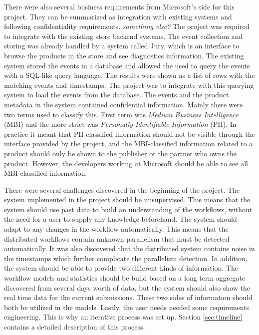 \documentclass[english,12pt,a4paper,pdftex,sci,utf8]{aaltothesis}
\newcommand{\nyi}[1]{\colorbox{nyibg}{\textcolor{nyitext}{\emph{#1}}}}
\begin{document}
There were also several business requirements from Microsoft's side for this project. They can be summarized as integration with existing systems and following confidentiality requirements. \nyi{something else?}
The project was required to integrate with the existing store backend systems. 
The event collection and storing was already handled by a system called Jury, which is an interface to browse the products in the store and see diagnostics information.
The existing system stored the events in a database and allowed the used to query the events with a SQL-like query language. The results were shown as a list of rows with the matching events and timestamps. The project was to integrate with this querying system to load the events from the database.
The events and the product metadata in the system contained confidential information. Mainly there were two terms used to classify this. First term was \textit{Medium Business Intelligence} (MBI) and the more strict was \textit{Personally Identifiable Information} (PII). In practice it meant that PII-classified information should not be visible through the interface provided by the project, and the MBI-classified information related to a product should only be shown to the publisher or the partner who owns the product. However, the developers working at Microsoft should be able to see all MBI-classified information.


There were several challenges discovered in the beginning of the project.
The system implemented in the project should be unsupervised.
This means that the system should use past data to build an understanding of the workflows, without the need for a user to supply any knowledge beforehand.
The system should adapt to any changes in the workflow automatically.
This means that the distributed workflows contain unknown parallelism that must be detected automatically.
It was also discovered that the distributed system contains noise in the timestamps which further complicate the parallelism detection.
In addition, the system should be able to provide two different kinds of information. The workflow models and statistics should be build based on a long term aggregate discovered from several days worth of data, but the system should also show the real time data for the current submissions.
These two sides of information should both be utilized in the models.
Lastly, the user needs needed some requirements engineering. This is why an iterative process was set up. Section \ref{sec:timeline} contains a detailed description of this process.
\end{document}
